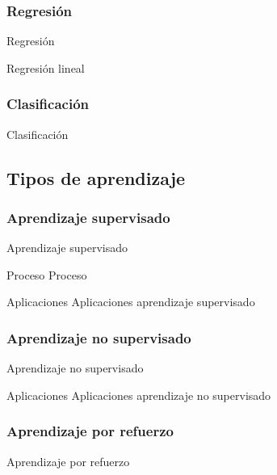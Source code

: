 \documentclass[hyperref={unicode}]{beamer}
\begin{document}
\subsubsection{Regresión}
\begin{frame}{Regresión}
	
\end{frame}

\begin{frame}{Regresión lineal}
	
\end{frame}

\subsubsection{Clasificación}
\begin{frame}{Clasificación}
	
\end{frame}

\subsection{Tipos de aprendizaje}
\subsubsection{Aprendizaje supervisado}
\begin{frame}{Aprendizaje supervisado}
	
\end{frame}

\begin{frame}{Proceso}
	Proceso
\end{frame}

\begin{frame}{Aplicaciones}
	Aplicaciones aprendizaje supervisado
\end{frame}

\subsubsection{Aprendizaje no supervisado}
\begin{frame}{Aprendizaje no supervisado}
	
\end{frame}

\begin{frame}{Aplicaciones}
	Aplicaciones aprendizaje no supervisado
\end{frame}

\subsubsection{Aprendizaje por refuerzo}
\begin{frame}{Aprendizaje por refuerzo}
	
\end{frame}
\end{document}
